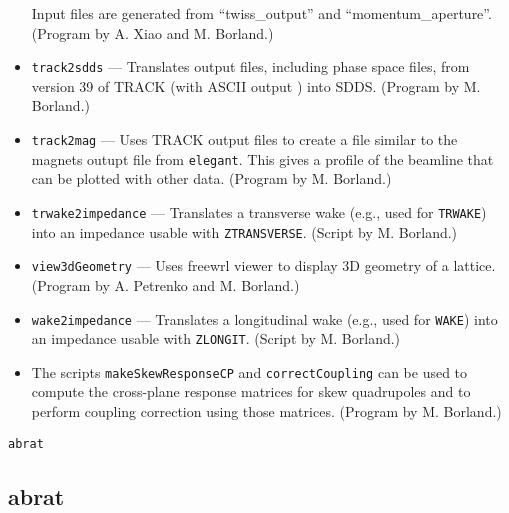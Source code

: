 \documentclass[11pt]{article}
\begin{document}
\begin{itemize}
        Input files are generated from ``twiss\_output'' and ``momentum\_aperture''.  (Program by A. Xiao and M. Borland.)
\item {\tt track2sdds} --- Translates output files, including phase space files, from version 39 of TRACK (with ASCII output \cite{TRACK})
  into SDDS. 
  (Program by M. Borland.)
\item {\tt track2mag} --- Uses TRACK output files to create a file similar to the magnets outupt file from {\tt elegant}.
  This gives a profile of the beamline that can be plotted with other data.
  (Program by M. Borland.)
\item {\tt trwake2impedance} --- Translates a transverse wake (e.g., used for \verb|TRWAKE|) into an impedance usable with
  \verb|ZTRANSVERSE|. (Script by M. Borland.)
\item {\tt view3dGeometry} --- Uses freewrl viewer to display 3D geometry of a lattice. 
  (Program by A. Petrenko and M. Borland.)
\item {\tt wake2impedance} --- Translates a longitudinal wake (e.g., used for \verb|WAKE|) into an impedance usable with
  \verb|ZLONGIT|. (Script by M. Borland.)
\item The scripts \verb|makeSkewResponseCP| and \verb|correctCoupling| can be used to compute the cross-plane response
  matrices for skew quadrupoles and to perform coupling correction using those matrices.
  (Program by M. Borland.)
\end{itemize}

\newpage
\begin{center}{\Large\verb|abrat|}\end{center}
\subsection{abrat}
\end{document}
